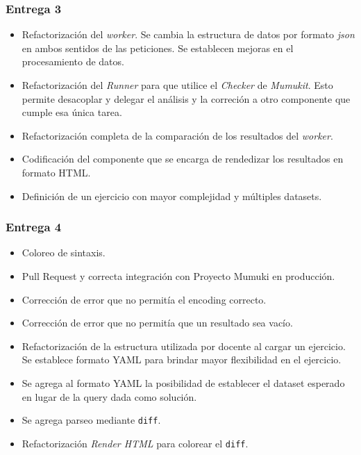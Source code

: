 \subsubsection{Entrega 3}

\begin{itemize}
    \item Refactorización del \textit{worker}.
    Se cambia la estructura de datos por formato \textit{json} en ambos sentidos
    de las peticiones.
    Se establecen mejoras en el procesamiento de datos.
    \item Refactorización del \textit{Runner} para que utilice el \textit{Checker}
    de \textit{Mumukit}. Esto permite desacoplar y delegar el análisis
    y la correción a otro componente que cumple esa única tarea.
    \item Refactorización completa de la comparación de los resultados del \textit{worker}.
    \item Codificación del componente que se encarga de rendedizar
    los resultados en formato HTML.
    \item Definición de un ejercicio con mayor complejidad y múltiples datasets.
\end{itemize}

\subsubsection{Entrega 4}

\begin{itemize}
    \item Coloreo de sintaxis.
    \item Pull Request y correcta integración con Proyecto Mumuki en producción.
    \item Corrección de error que no permitía el encoding correcto.
    \item Corrección de error que no permitía que un resultado sea vacío.
    \item Refactorización de la estructura utilizada por docente al cargar un ejercicio.
    Se establece formato YAML para brindar mayor flexibilidad en el ejercicio.
    \item Se agrega al formato YAML la posibilidad de establecer el dataset
    esperado en lugar de la query dada como solución.
    \item Se agrega parseo mediante \texttt{diff}.
    \item Refactorización \textit{Render HTML} para colorear el \texttt{diff}.
\end{itemize}
